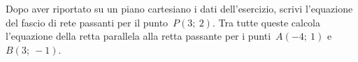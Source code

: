  \begin{esempio}
  Dopo aver riportato su un piano cartesiano i dati dell'esercizio,
  scrivi l'equazione del fascio di rete passanti per il punto~\(P(3;~2)\).
  Tra tutte queste calcola l'equazione della retta parallela alla retta 
  passante per i punti~\(A(-4;~1)\) e~\(B(3;~-1)\).
  
\begin{inaccessibleblock}
 \begin{figure}[h]
 \centering
{}
\label{fig:metodorapido}
\end{figure}
\end{inaccessibleblock}
 \end{esempio}

